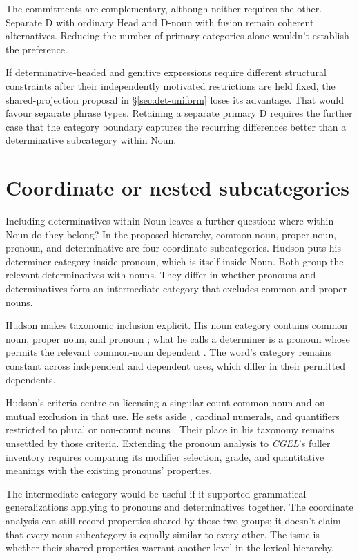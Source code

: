 \documentclass[12pt]{article}
\begin{document}
The commitments are complementary, although neither requires the other. Separate D with ordinary Head and D-noun with fusion remain coherent alternatives. Reducing the number of primary categories alone wouldn't establish the preference.

If determinative-headed and genitive expressions require different structural constraints after their independently motivated restrictions are held fixed, the shared-projection proposal in §\ref{sec:det-uniform} loses its advantage. That would favour separate phrase types. Retaining a separate primary D requires the further case that the category boundary captures the recurring differences better than a determinative subcategory within Noun.

\section{Coordinate or nested subcategories}\label{sec:inheritance}

Including determinatives within Noun leaves a further question: where within Noun do they belong? In the proposed hierarchy, common noun, proper noun, pronoun, and determinative are four coordinate subcategories. Hudson puts his determiner category inside pronoun, which is itself inside Noun. Both group the relevant determinatives with nouns. They differ in whether pronouns and determinatives form an intermediate category that excludes common and proper nouns.

Hudson makes taxonomic inclusion explicit. His noun category contains common noun, proper noun, and pronoun \citep[253--254]{hudson2010wordgrammar}; what he calls a determiner is a pronoun whose  permits the relevant common-noun dependent \citep[9--10]{hudson2004determiners}. The word's category remains constant across independent and dependent uses, which differ in their permitted dependents.

Hudson's criteria centre on licensing a singular count common noun and on mutual exclusion in that use. He sets aside , cardinal numerals, and quantifiers restricted to plural or non-count nouns \citep[9--10]{hudson2004determiners}. Their place in his taxonomy remains unsettled by those criteria. Extending the pronoun analysis to \textit{CGEL}'s fuller inventory requires comparing its modifier selection, grade, and quantitative meanings with the existing pronouns' properties.

The intermediate category would be useful if it supported grammatical generalizations applying to pronouns and determinatives together. The coordinate analysis can still record properties shared by those two groups; it doesn't claim that every noun subcategory is equally similar to every other. The issue is whether their shared properties warrant another level in the lexical hierarchy.
\end{document}
